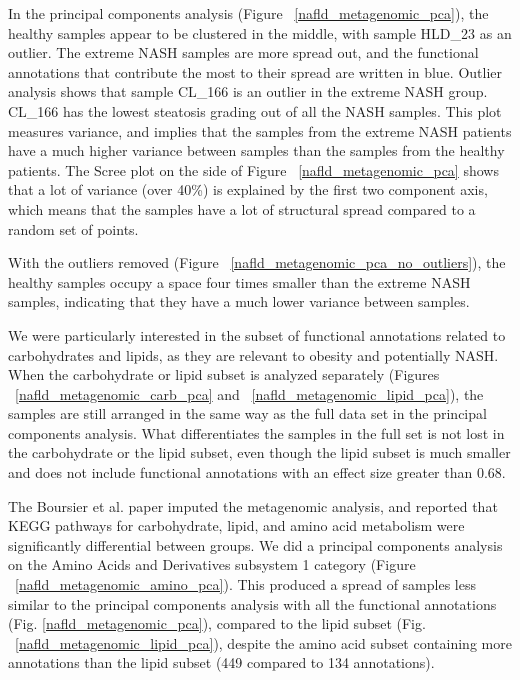 In the principal components analysis (Figure ~\ref{nafld_metagenomic_pca}), the healthy samples appear to be clustered in the middle, with sample HLD\_23 as an outlier. The extreme NASH samples are more spread out, and the functional annotations that contribute the most to their spread are written in blue. Outlier analysis shows that sample CL\_166 is an outlier in the extreme NASH group. CL\_166 has the lowest steatosis grading out of all the NASH samples. This plot measures variance, and implies that the samples from the extreme NASH patients have a much higher variance between samples than the samples from the healthy patients. The Scree plot on the side of Figure ~\ref{nafld_metagenomic_pca} shows that a lot of variance (over 40\%) is explained by the first two component axis, which means that the samples have a lot of structural spread compared to a random set of points.

With the outliers removed (Figure ~\ref{nafld_metagenomic_pca_no_outliers}), the healthy samples occupy a space four times smaller than the extreme NASH samples, indicating that they have a much lower variance between samples.

We were particularly interested in the subset of functional annotations related to carbohydrates and lipids, as they are relevant to obesity and potentially NASH. When the carbohydrate or lipid subset is analyzed separately (Figures ~\ref{nafld_metagenomic_carb_pca} and ~\ref{nafld_metagenomic_lipid_pca}), the samples are still arranged in the same way as the full data set in the principal components analysis. What differentiates the samples in the full set is not lost in the carbohydrate or the lipid subset, even though the lipid subset is much smaller and does not include functional annotations with an effect size greater than 0.68.

The Boursier et al. \cite{boursier2016severity} paper imputed the metagenomic analysis, and reported that KEGG pathways for carbohydrate, lipid, and amino acid metabolism were significantly differential between groups. We did a principal components analysis on the Amino Acids and Derivatives subsystem 1 category (Figure ~\ref{nafld_metagenomic_amino_pca}). This produced a spread of samples less similar to the principal components analysis with all the functional annotations (Fig. \ref{nafld_metagenomic_pca}), compared to the lipid subset (Fig. ~\ref{nafld_metagenomic_lipid_pca}), despite the amino acid subset containing more annotations than the lipid subset (449 compared to 134 annotations).

